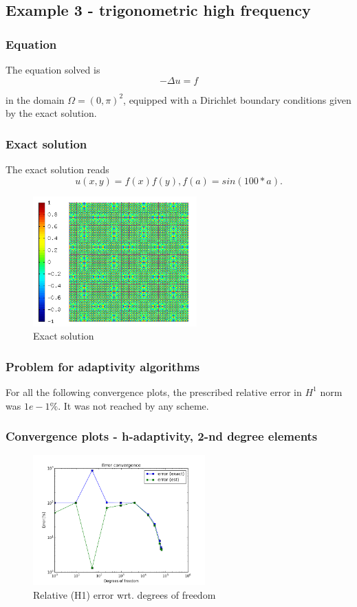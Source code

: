 	\newpage
	\subsection{Example 3 - trigonometric high frequency}
		\subsubsection{Equation}
		The equation solved is
		\begin{equation}
			-\Delta u = f
		\end{equation}

		in the domain $\Omega = (0, \pi)^2$, equipped with a Dirichlet
		boundary conditions given by the exact solution.

		\subsubsection{Exact solution}
		The exact solution reads
		\begin{equation}
			u(x, y) = f(x) f(y), f(a) = sin(100*a).
		\end{equation}
		\begin{figure}[H]
			\centering
			\includegraphics[height=5cm]{img/exact-sin100.png}
			\caption{Exact solution}
			\label{fig:exact-sin100}
		\end{figure}

		\subsubsection{Problem for adaptivity algorithms}
		
			
			For all the following convergence plots, the prescribed relative error in $H^1$ norm was $1e-1\%$. It was not reached by any scheme.
		
		\subsubsection{Convergence plots - h-adaptivity, 2-nd degree elements}
			\begin{figure}[H]
				\centering
				\includegraphics[height=5cm]{img/sin100-h2-dof.png}
				\caption{Relative (H1) error wrt. degrees of freedom}
			\end{figure}
			
